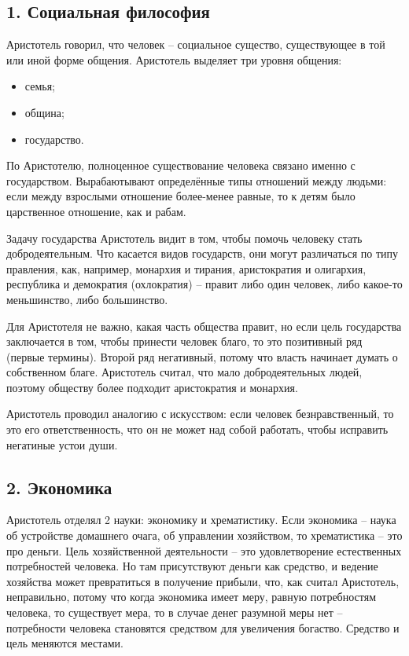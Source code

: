 \documentclass[a4paper, 12pt]{article} %
\begin{document}
\subsection*{1. Социальная философия}
Аристотель говорил, что человек -- социальное существо, существующее в той или иной форме общения.
Аристотель выделяет три уровня общения:
\begin{itemize}
\item семья;
\item община;
\item государство.
\end{itemize}
По Аристотелю, полноценное существование человека связано именно с государством. Вырабаютывают определённые типы отношений между людьми: если между взрослыми отношение более-менее равные, то к детям было царственное отношение, как и рабам. 

Задачу государства Аристотель видит в том, чтобы помочь человеку стать добродеятельным.
Что касается видов государств, они могут различаться по типу правления, как, например, монархия и тирания, аристократия и олигархия, республика и демократия (охлократия) -- правит либо один человек, либо какое-то меньшинство, либо большинство.

Для Аристотеля не важно, какая часть общества правит, но если цель государства заключается в том, чтобы принести человек благо, то это позитивный ряд (первые термины). Второй ряд негативный, потому что власть начинает думать о собственном благе. Аристотель считал, что мало добродеятельных людей, поэтому обществу более подходит аристократия и монархия.

Аристотель проводил аналогию с искусством: если человек безнравственный, то это его ответственность, что он не может над собой работать, чтобы исправить негатиные устои души.

\subsection*{2. Экономика}

Аристотель отделял 2 науки: экономику и хрематистику. Если экономика -- наука об устройстве домашнего очага, об управлении хозяйством, то хрематистика -- это про деньги. Цель хозяйственной деятельности -- это удовлетворение естественных потребностей человека. Но там присутствуют деньги как средство, и ведение хозяйства может превратиться в получение прибыли, что, как считал Аристотель, неправильно, потому что когда экономика имеет меру, равную потребностям человека, то существует мера, то в случае денег разумной меры нет -- потребности человека становятся средством для увеличения богаство. Средство и цель меняются местами.
\end{document}
